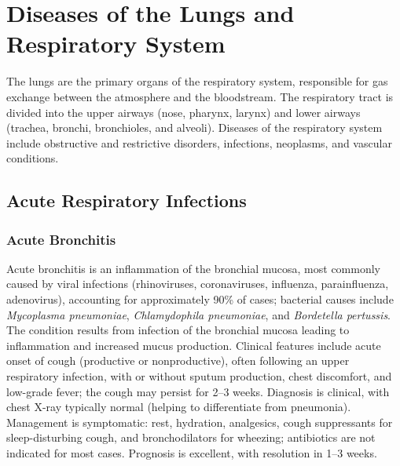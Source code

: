 \chapter{Diseases of the Lungs and Respiratory System}
\label{ch:lungs}
The lungs are the primary organs of the respiratory system, responsible for gas exchange between the atmosphere and the bloodstream. The respiratory tract is divided into the upper airways (nose, pharynx, larynx) and lower airways (trachea, bronchi, bronchioles, and alveoli). Diseases of the respiratory system include obstructive and restrictive disorders, infections, neoplasms, and vascular conditions.

\section{Acute Respiratory Infections}








\label{sec:Acute Respiratory Infections}

\subsection{Acute Bronchitis}
\label{sec:Acute Bronchitis}
Acute bronchitis is an inflammation of the bronchial mucosa, most commonly caused by viral infections (rhinoviruses, coronaviruses, influenza, parainfluenza, adenovirus), accounting for approximately 90\% of cases; bacterial causes include \textit{Mycoplasma pneumoniae}, \textit{Chlamydophila pneumoniae}, and \textit{Bordetella pertussis}. The condition results from infection of the bronchial mucosa leading to inflammation and increased mucus production. Clinical features include acute onset of cough (productive or nonproductive), often following an upper respiratory infection, with or without sputum production, chest discomfort, and low-grade fever; the cough may persist for 2--3 weeks. Diagnosis is clinical, with chest X-ray typically normal (helping to differentiate from pneumonia). Management is symptomatic: rest, hydration, analgesics, cough suppressants for sleep-disturbing cough, and bronchodilators for wheezing; antibiotics are not indicated for most cases. Prognosis is excellent, with resolution in 1--3 weeks.

